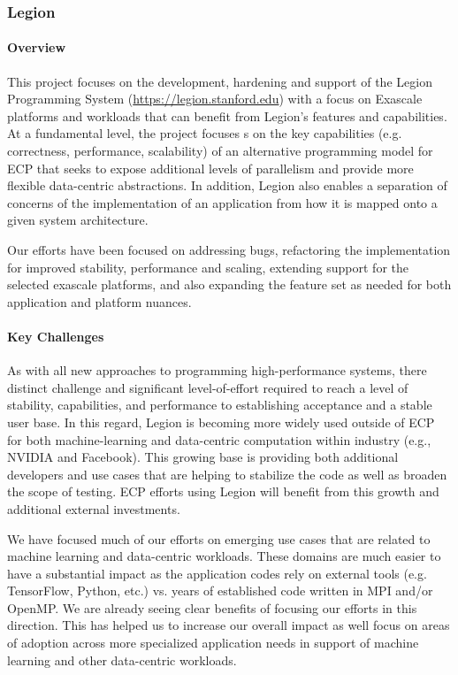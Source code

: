 \subsubsection{ Legion}

\paragraph{Overview}
This project focuses on the development, hardening and support of the
Legion Programming System (\url{https://legion.stanford.edu}) with a
focus on Exascale platforms and workloads that can benefit from
Legion's features and capabilities.  At a fundamental level, the
project focuses s on the key capabilities (e.g. correctness,
performance, scalability) of an alternative programming model for ECP
that seeks to expose additional levels of parallelism and provide more
flexible data-centric abstractions.  In addition, Legion also enables
a separation of concerns of the implementation of an application from
how it is mapped onto a given system architecture.

Our efforts have been focused on addressing bugs, refactoring the
implementation for improved stability, performance and scaling,
extending support for the selected exascale platforms, and also
expanding the feature set as needed for both application and
platform nuances.

\paragraph{Key Challenges}
As with all new approaches to programming high-performance systems,
there distinct challenge and significant level-of-effort required to
reach a level of stability, capabilities, and performance to
establishing acceptance and a stable user base.  In this regard,
Legion is becoming more widely used outside of ECP for both
machine-learning and data-centric computation within industry (e.g.,
NVIDIA and Facebook).  This growing base is providing both additional
developers and use cases that are helping to stabilize the code as well
as broaden the scope of testing.  ECP efforts using Legion will
benefit from this growth and additional external investments.

We have focused much of our efforts on emerging use cases that are
related to machine learning and data-centric workloads.  These domains
are much easier to have a substantial impact as the application codes
rely on external tools (e.g. TensorFlow, Python, etc.) vs. years of
established code written in MPI and/or OpenMP.  We are already seeing
clear benefits of focusing our efforts in this direction. This has
helped us to increase our overall impact as well focus on areas of
adoption across more specialized application needs in support of
machine learning and other data-centric workloads.

